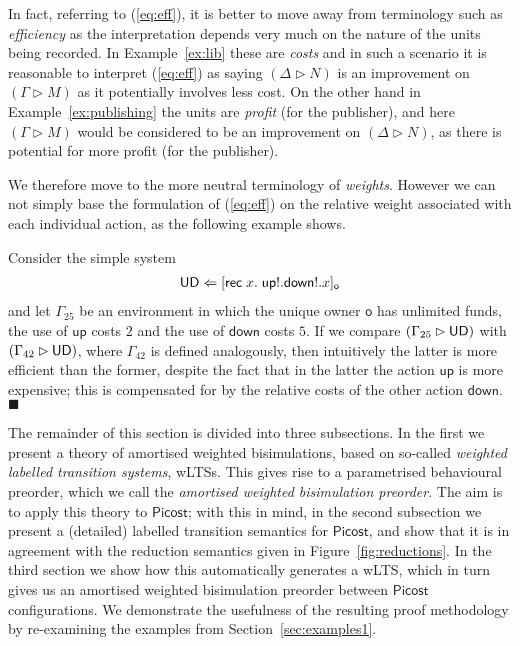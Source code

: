 \documentclass{LMCS}
\newcommand{\pfn}[1]{\mathsf{#1}}  \newcommand{\cfn}[1]{\mathsf{#1}}  \newcommand{\ownfnt}[1]{{\mathsf{#1}}}
\newcommand{\picost}{\ensuremath{\pfn{Picost}}\xspace}
\newcommand{\with}{\mathbin \rhd}
\newcommand{\Crec}[2]{\pfn{rec}\;#1.\;#2}
\newcommand{\Cloc}[2]{[#1]_{\ownfnt{#2}}}
\newcommand{\EndDefBox}{\null\hfill$\blacksquare$}
\newcommand{\boxHere}{\global\let\EndProof\empty\EndDefBox}
\begin{document}
In fact, referring to (\ref{eq:eff}), it is better to move away from
terminology such as \emph{efficiency} as the interpretation 
depends very much on the nature of the units being
recorded. In Example~\ref{ex:lib} these are \emph{costs} and in such a
scenario it is reasonable to interpret (\ref{eq:eff}) as saying
$(\Delta \with N)$ is an improvement on $(\Gamma \with M)$ as it
potentially involves less cost. On the other hand in
Example~\ref{ex:publishing} the units are \emph{profit} (for the publisher), and here
$(\Gamma \with M)$ would be considered to be an improvement on
$(\Delta \with N)$, as there is potential for more profit (for the publisher).

We therefore move to the more neutral terminology of \emph{weights}.
However we can not simply base the formulation of (\ref{eq:eff}) on
the relative weight associated with each individual action, as the
following example shows.  \newcommand{\Up}{\cfn{up}}
\newcommand{\down}{\cfn{down}}

\begin{exa}\label{ex:amort}
Consider the simple system 
\begin{align*}
  \UD \Leftarrow  \Cloc{\Crec{x}{\Up!.\down!.x}}{o}
\end{align*}
and let $\Gamma_{25}$ be an environment in which the unique owner
$\ownfnt o$ has unlimited funds, the use of $\Up$ costs $2$ and the
use of $\down$ costs $5$. If we compare $(\Gamma_{25} \with \UD)$ with
$(\Gamma_{42} \with \UD)$, where $\Gamma_{42}$ is defined analogously,
then intuitively the latter is more efficient than the former, despite
the fact that in the latter the action $\Up$ is more expensive; this
is compensated for by the relative costs of the other action $\down$.
\boxHere
\end{exa}

The remainder of this section is divided into three subsections. In the
first we present a theory of amortised weighted bisimulations, based on
so-called \emph{weighted labelled transition systems}, wLTSs.  This gives rise
to a parametrised behavioural preorder, which we call the
\emph{amortised weighted bisimulation preorder}.  The aim is to apply
this theory to $\picost$; with this in mind, in the second subsection
we present a (detailed) labelled transition semantics for \picost, and
show that it is in agreement with the reduction semantics given in
Figure~\ref{fig:reductions}. In the third section we show how this 
automatically generates a wLTS, which in turn gives us an
amortised weighted bisimulation preorder between \picost configurations. 
We demonstrate the usefulness of the resulting proof methodology
by re-examining the examples from Section~\ref{sec:examples1}.
\end{document}
